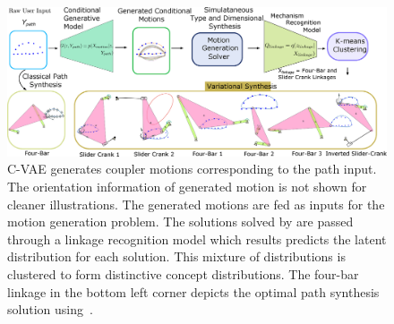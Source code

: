 \begin{figure}
\centering
\includegraphics[width=\textwidth]{jmd-19/figure/fig_user_interaction_2.eps}
  \caption{C-VAE generates coupler motions corresponding to the path input. The orientation information of generated motion is not shown for cleaner illustrations. The generated motions are fed as inputs for the motion generation problem. The solutions solved by \cite{generalfitting-JCISE} are passed through a linkage recognition model which results predicts the latent distribution for each solution. This mixture of distributions is clustered to form distinctive concept distributions. The four-bar linkage in the bottom left corner depicts the optimal path synthesis solution using~\cite{sharma2019optimal}.}
\label{fig_user_interaction}
\end{figure}



